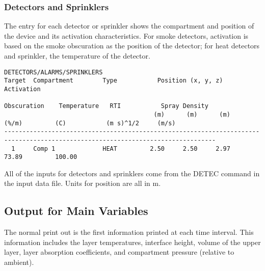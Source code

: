 \subsubsection{Detectors and Sprinklers}

The entry for each detector or sprinkler shows the compartment and position of the device and its activation characteristics. For smoke detectors, activation is based on the smoke obscuration as the position of the detector; for heat detectors and sprinkler, the temperature of the detector.


\begin{lstlisting}[basicstyle=\tiny]
DETECTORS/ALARMS/SPRINKLERS
Target  Compartment        Type           Position (x, y, z)            Activation
                                                                        Obscuration    Temperature   RTI           Spray Density
                                         (m)      (m)      (m)          (%/m)         (C)           (m s)^1/2     (m/s)
--------------------------------------------------------------------------------------------------------------------------------
  1     Comp 1             HEAT         2.50     2.50     2.97                         73.89         100.00
\end{lstlisting}
All of the inputs for detectors and sprinklers come from the DETEC command in the input data file. Units for position are all in m.

\subsection{Output for Main Variables}

The normal print out is the first information printed at each time interval.  This information includes the layer temperatures, interface height, volume of the upper layer, layer absorption coefficients, and compartment pressure (relative to ambient).

